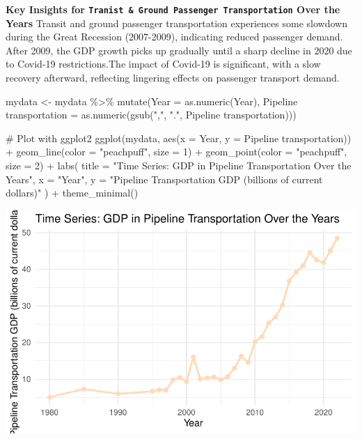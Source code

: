 \documentclass[
  letterpaper,
  DIV=11,
  numbers=noendperiod]{scrreprt}
\newenvironment{Shaded}{\begin{snugshade}}{\end{snugshade}}
\newcommand{\AttributeTok}[1]{\textcolor[rgb]{0.40,0.45,0.13}{#1}}
\newcommand{\CommentTok}[1]{\textcolor[rgb]{0.37,0.37,0.37}{#1}}
\newcommand{\DecValTok}[1]{\textcolor[rgb]{0.68,0.00,0.00}{#1}}
\newcommand{\FunctionTok}[1]{\textcolor[rgb]{0.28,0.35,0.67}{#1}}
\newcommand{\NormalTok}[1]{\textcolor[rgb]{0.00,0.23,0.31}{#1}}
\newcommand{\OtherTok}[1]{\textcolor[rgb]{0.00,0.23,0.31}{#1}}
\newcommand{\SpecialCharTok}[1]{\textcolor[rgb]{0.37,0.37,0.37}{#1}}
\newcommand{\StringTok}[1]{\textcolor[rgb]{0.13,0.47,0.30}{#1}}
\begin{document}
\textbf{Key Insights for
\texttt{Tranist\ \&\ Ground\ Passenger\ Transportation} Over the Years}
Transit and ground passenger transportation experiences some slowdown
during the Great Recession (2007-2009), indicating reduced passenger
demand. After 2009, the GDP growth picks up gradually until a sharp
decline in 2020 due to Covid-19 restrictions.The impact of Covid-19 is
significant, with a slow recovery afterward, reflecting lingering
effects on passenger transport demand.

\begin{Shaded}
\begin{Highlighting}[]
\NormalTok{mydata }\OtherTok{\textless{}{-}}\NormalTok{ mydata }\SpecialCharTok{\%\textgreater{}\%}
  \FunctionTok{mutate}\NormalTok{(}\AttributeTok{Year =} \FunctionTok{as.numeric}\NormalTok{(Year),}
         \StringTok{\textasciigrave{}}\AttributeTok{Pipeline transportation}\StringTok{\textasciigrave{}} \OtherTok{=} \FunctionTok{as.numeric}\NormalTok{(}\FunctionTok{gsub}\NormalTok{(}\StringTok{","}\NormalTok{, }\StringTok{"."}\NormalTok{, }\StringTok{\textasciigrave{}}\AttributeTok{Pipeline transportation}\StringTok{\textasciigrave{}}\NormalTok{)))}

\CommentTok{\# Plot with ggplot2}
\FunctionTok{ggplot}\NormalTok{(mydata, }\FunctionTok{aes}\NormalTok{(}\AttributeTok{x =}\NormalTok{ Year, }\AttributeTok{y =} \StringTok{\textasciigrave{}}\AttributeTok{Pipeline transportation}\StringTok{\textasciigrave{}}\NormalTok{)) }\SpecialCharTok{+}
  \FunctionTok{geom\_line}\NormalTok{(}\AttributeTok{color =} \StringTok{"peachpuff"}\NormalTok{, }\AttributeTok{size =} \DecValTok{1}\NormalTok{) }\SpecialCharTok{+}
  \FunctionTok{geom\_point}\NormalTok{(}\AttributeTok{color =} \StringTok{"peachpuff"}\NormalTok{, }\AttributeTok{size =} \DecValTok{2}\NormalTok{) }\SpecialCharTok{+}
  \FunctionTok{labs}\NormalTok{(}
    \AttributeTok{title =} \StringTok{"Time Series: GDP in Pipeline Transportation Over the Years"}\NormalTok{,}
    \AttributeTok{x =} \StringTok{"Year"}\NormalTok{,}
    \AttributeTok{y =} \StringTok{"Pipeline Transportation GDP (billions of current dollars)"}
\NormalTok{  ) }\SpecialCharTok{+}
  \FunctionTok{theme\_minimal}\NormalTok{()}
\end{Highlighting}
\end{Shaded}

\includegraphics{FinalProject_Abigail_files/figure-pdf/unnamed-chunk-7-1.pdf}
\end{document}
